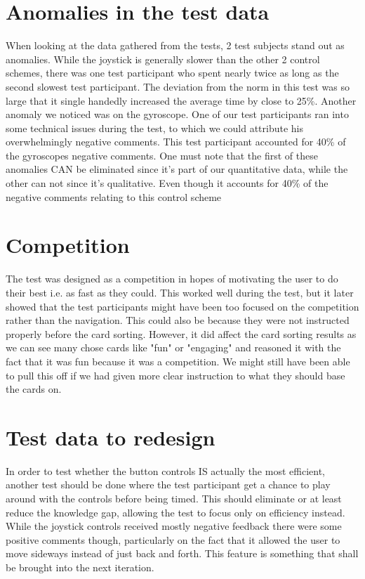 \section{Anomalies in the test data}
When looking at the data gathered from the tests, 2 test subjects stand out as anomalies. While the joystick is generally slower than the other 2 control schemes, there was one test participant who spent nearly twice as long as the second slowest test participant.
The deviation from the norm in this test was so large that it single handedly increased the average time by close to 25\%.
Another anomaly we noticed was on the gyroscope. One of our test participants ran into some technical issues during the test, to which we could attribute his overwhelmingly negative comments. This test participant accounted for 40\% of the gyroscopes negative comments.
One must note that the first of these anomalies CAN be eliminated since it's part of our quantitative data, while the other can not since it's qualitative. Even though it accounts for 40\% of the negative comments relating to this control scheme
\section{Competition}
The test was designed as a competition in hopes of motivating the user to do their best i.e. as fast as they could. This worked well during the test, but it later showed that the test participants might have been too focused on the competition rather than the navigation. This could also be because they were not instructed properly before the card sorting. However, it did affect the card sorting results as we can see many chose cards like "fun" or "engaging" and reasoned it with the fact that it was fun because it was a competition. 
We might still have been able to pull this off if we had given more clear instruction to what they should base the cards on. 
\section{Test data to redesign}
In order to test whether the button controls IS actually the most efficient, another test should be done where the test participant get a chance to play around with the controls before being timed. This should eliminate or at least reduce the knowledge gap, allowing the test to focus only on efficiency instead.
While the joystick controls received mostly negative feedback there were some positive comments though, particularly on the fact that it allowed the user to move sideways instead of just back and forth. This feature is something that shall be brought into the next iteration.


